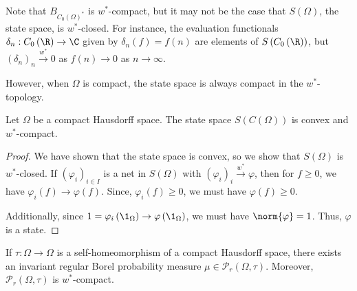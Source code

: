 \documentclass[10pt]{mypackage}
\begin{document}
Note that $B_{C_{0}\left(\Omega\right)^{\ast}}$ is $w^{\ast}$-compact, but it may not be the case that $S\left(\Omega\right)$, the state space, is $w^{\ast}$-closed. For instance, the evaluation functionals $\delta_n: C_0\left(\R\right)\rightarrow \C$ given by $\delta_n\left(f\right) = f(n)$ are elements of $S\left(C_0\left(\R\right)\right)$, but $\left(\delta_n\right)_n\xrightarrow{w^{\ast}} 0$ as $f(n)\rightarrow 0$ as $n\rightarrow\infty$.\newline

However, when $\Omega$ is compact, the state space is always compact in the $w^{\ast}$-topology.
\begin{proposition}
  Let $\Omega$ be a compact Hausdorff space. The state space $S\left(C\left(\Omega\right)\right)$ is convex and $w^{\ast}$-compact.
\end{proposition}
\begin{proof}
  We have shown that the state space is convex, so we show that $S\left(\Omega\right)$ is $w^{\ast}$-closed. If $\left(\varphi_i\right)_{i\in I}$ is a net in $S\left(\Omega\right)$ with $\left(\varphi_i\right)_i\xrightarrow{w^{\ast}}\varphi$, then for $f\geq 0$, we have $\varphi_i\left(f\right)\rightarrow \varphi(f)$. Since, $\varphi_i(f)\geq 0$, we must have $\varphi(f) \geq 0$.\newline

  Additionally, since $1 = \varphi_i\left(\1_{\Omega}\right) \rightarrow \varphi\left(\1_{\Omega}\right)$, we must have $\norm{\varphi} = 1$. Thus, $\varphi$ is a state.
\end{proof}
\begin{corollary}
  If $\tau: \Omega\rightarrow\Omega$ is a self-homeomorphism of a compact Hausdorff space, there exists an invariant regular Borel probability measure $\mu\in \mathcal{P}_{r}\left(\Omega,\tau\right)$. Moreover, $\mathcal{P}_{r}\left(\Omega,\tau\right)$ is $w^{\ast}$-compact.
\end{corollary}
\end{document}
